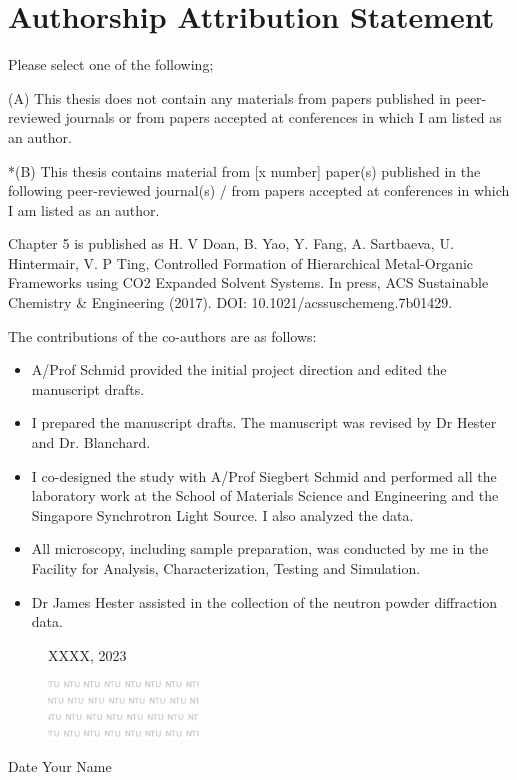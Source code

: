 \chapter*{Authorship Attribution Statement}
\begin{spacing}{2}
Please select one of the following;

(A) This thesis does not contain any materials from papers published in peer-reviewed journals or from papers accepted at conferences in which I am listed as an author.

*(B) This thesis contains material from [x number] paper(s) published in the following peer-reviewed journal(s) / from papers accepted at conferences in which I am listed as an author. 

Chapter 5 is published as H. V Doan, B. Yao, Y. Fang, A. Sartbaeva, U. Hintermair, V. P Ting, Controlled Formation of Hierarchical Metal-Organic Frameworks using CO2 Expanded Solvent Systems. In press, ACS Sustainable Chemistry \& Engineering (2017). DOI: 10.1021/acssuschemeng.7b01429.

The contributions of the co-authors are as follows:
\begin{itemize}\itemsep-0.25em
    \item A/Prof Schmid provided the initial project direction and edited the manuscript drafts.
    \item I prepared the manuscript drafts.  The manuscript was revised by Dr Hester and Dr. Blanchard.
    \item I co-designed the study with A/Prof Siegbert Schmid and performed all the laboratory work at the School of Materials Science and Engineering and the Singapore Synchrotron Light Source.   I also analyzed the data.
    \item All microscopy, including sample preparation, was conducted by me in the Facility for Analysis, Characterization, Testing and Simulation.
    \item Dr James Hester assisted in the collection of the neutron powder diffraction data.
\end{itemize}
\end{spacing}
\vfill
\begin{figure}[htbp]
  \begin{minipage}[c]{0.5\textwidth}
    XXXX, 2023
  \end{minipage}\hfill
  \begin{minipage}[c]{0.45\textwidth}
    \includegraphics[width=4cm]{pre_figure/ntu_water.png}
  \end{minipage}
\end{figure}
\vspace*{-0.1cm}
Date \hspace{7cm} Your Name
\vspace{1cm}
\clearpage
\setcounter{page}{5}

